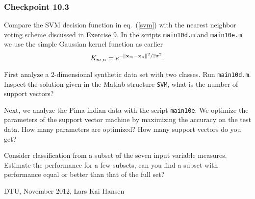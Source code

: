 \documentclass[12pt]{article}    %
\def\xb{{\bf x}}
\begin{document}
\subsubsection*{Checkpoint 10.3}
Compare the SVM  decision function in eq.\ (\ref{svm}) with the nearest neighbor voting scheme discussed in Exercise 9.
In the scripts {\tt main10d.m} and {\tt main10e.m} we use the simple Gaussian kernel function as earlier
\begin{equation}
 K_{m,n} = e^{ -\| \xb_m -\xb_n \|^2/2\sigma^2 }.
\end{equation}

First analyze a 2-dimensional synthetic data set with two classes.
Run {\tt main10d.m}. Inspect the solution given in the Matlab structure {\tt SVM}, what is the number of support vectors?

Next, we analyze the Pima indian data with the script {\tt main10e}.
We optimize the parameters of the support vector machine by maximizing the accuracy on the test data.
How many parameters are optimized?
How many support vectors do you get?

Consider classification from a subset of the seven input variable measures.
Estimate the performance for a few subsets, can you find a subset
with performance equal or better than that of the full set?


\vspace{2cm}
\noindent DTU, November 2012, Lars Kai Hansen
\end{document}
